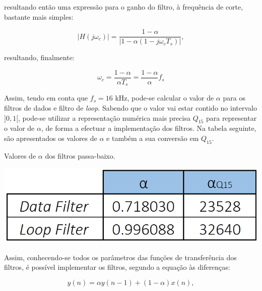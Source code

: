 \documentclass[11pt]{article}
\numberwithin{equation}{section}
\begin{document}
\vspace{1mm}
resultando então uma expressão para o ganho do filtro, à frequência de corte, bastante mais simples:

\vspace{-3mm}
\begin{equation}
|H(j\omega_c)| =  \frac{1 - \alpha}{|1-\alpha(1-j\omega_c T_s)|},
\end{equation} 

\vspace{1mm}
resultando, finalmente:

\vspace{-3mm}
\begin{equation}
\omega_c = \frac{1 - \alpha}{\alpha T_s} = \frac{1 - \alpha}{\alpha} f_s
\label{eq:alfa}
\end{equation} 

\vspace{1mm}
Assim, tendo em conta que $f_s = 16$ kHz, pode-se calcular o valor de $\alpha$ para os filtros de dados e filtro de \textit{loop}. Sabendo que o valor vai estar contido no intervalo $]0,1[$, pode-se utilizar a representação numérica mais precisa $Q_{15}$ para representar o valor de $\alpha$, de forma a efectuar a implementação dos filtros. Na tabela seguinte, são apresentados os valores de $\alpha$ e também a sua conversão em $Q_{15}$.

\begin{table}[H]
	\centering
	\caption{Valores de $\alpha$ dos filtros passa-baixo.}
	\vspace{-1.5mm}
	\includegraphics[keepaspectratio=true, scale=0.35]{tabelas/alphas}
\end{table}

Assim, conhecendo-se todos os parâmetros das funções de transferência dos filtros, é possível implementar os filtros, segundo a equação às diferenças:

\vspace{-3mm}
\begin{equation}
y(n) = \alpha y(n-1) +  (1-\alpha)x(n),
\end{equation} 
\end{document}
